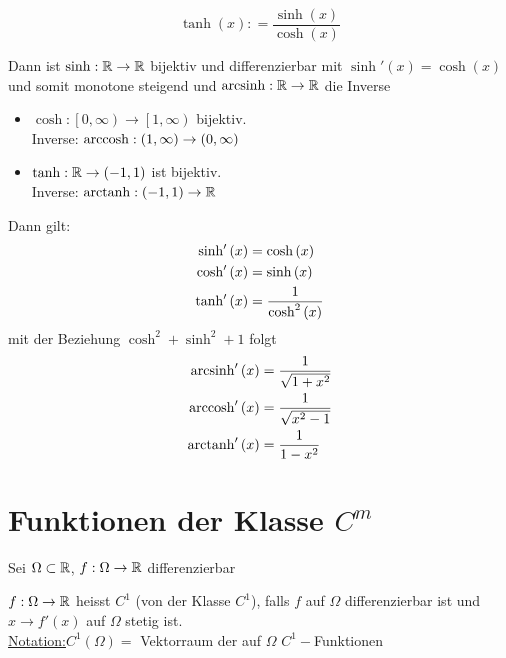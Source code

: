 \begin{enumerate}
\begin{multicols}{2}
\null\vfill
\[\tanh \left( x \right): = \frac{{\sinh \left( x \right)}}{{\cosh \left( x \right)}}\]
\null\vfill
\columnbreak
{}
\end{multicols}

Dann ist $\sinh:\mathbb{R}\to\mathbb{R}$ bijektiv und differenzierbar mit $\sinh'(x)=\cosh(x)$ und somit monotone steigend und $\operatorname{arcsinh}:\mathbb{R}\to\mathbb{R}$ die Inverse
\begin{itemize}
\item $\cosh :\left[ {0,\infty } \right) \to \left[ {1,\infty } \right)$ bijektiv.\\
Inverse: $\operatorname{arccosh}:\left( 1,\infty\right)\to\left( 0,\infty\right)$
\item $\tanh :\mathbb{R} \to \left( {-1,1 } \right)$ ist bijektiv.\\
Inverse: $\operatorname{arctanh}:\left( -1,1\right)\to\mathbb{R}$
\end{itemize}
Dann gilt:
\begin{align*}
{\mathop{\rm sinh'}\nolimits} \left( x \right) &= \cosh \left( x \right)\\
{\mathop{\rm cosh'}\nolimits} \left( x \right) &= \sinh \left( x \right)\\
{\mathop{\rm tanh'}\nolimits} \left( x \right) &= \frac{1}{{{{\cosh }^2}\left( x \right)}}
\end{align*}
mit der Beziehung $\cosh^2+\sinh^2+1$ folgt
\begin{align*}
\operatorname{arcsinh}'\left( x \right) &= \frac{1}{{\sqrt {1 + {x^2}} }}\\
\operatorname{arccosh}'\left( x \right) &= \frac{1}{{\sqrt {{x^2} - 1} }}\\
\operatorname{arctanh}'\left( x \right) &= \frac{1}{{1 - {x^2}}}
\end{align*}
\end{enumerate}

\section{Funktionen der Klasse $C^m$}
Sei $\Omega\subset\mathbb{R}$, $f:\Omega\to\mathbb{R}$ differenzierbar
\begin{definition}{5.23}
$f:\Omega\to\mathbb{R}$ heisst $C^1$ (von der Klasse $C^1$), falls $f$ auf $\Omega$ differenzierbar ist und $x\to f'(x)$ auf $\Omega$ stetig ist.\\

\noindent\underline{Notation:}$C^1\left( \Omega\right)=$ Vektorraum der auf $\Omega$ $C^1-$Funktionen
\end{definition}

